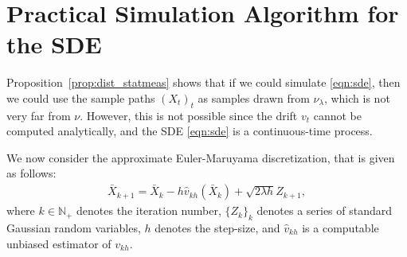 \section{Practical Simulation Algorithm for the SDE}

Proposition~\ref{prop:dist_statmeas} shows that if we could simulate \eqref{eqn:sde}, then we could use the sample paths $(X_t)_t$ as
samples drawn from $\nu_\lambda$, which is not very far from $\nu$. However, this is not possible since the drift $v_t$ cannot be computed analytically, and the SDE \eqref{eqn:sde} is a continuous-time process.  

We now consider the approximate Euler-Maruyama discretization, that is given as follows:
\begin{align}
\bar{X}_{k+1} = \bar{X}_k - h \hat{v}_{kh}(\bar{X}_k) + \sqrt{2 \lambda h} Z_{k+1},
\end{align}
where $k \in \mathbb{N}_+$ denotes the iteration number, $\{Z_k\}_{k}$ denotes a series of standard Gaussian random variables, $h$ denotes the step-size, and $\hat{v}_{kh}$ is a computable unbiased estimator of $v_{kh}$.


